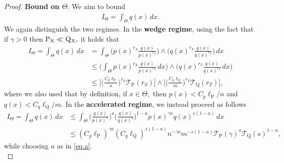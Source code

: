 \documentclass[10pt]{article}
\newcommand{\mT}{\mathcal{T}}
\renewcommand{\P}{\operatorname{P}}
\newcommand{\Q}{\operatorname{Q}}
\newcommand{\sX}{\mathrm{X}}
\begin{document}
\begin{proof}
    \noindent\textbf{Bound on $\Theta.$} We aim to bound
    \begin{align*}
        I_{\Theta} = \int_{\Theta}q(x)\, dx.
    \end{align*}
    We again distinguish the two regimes. In the \textbf{wedge regime}, using the fact that if $\gamma > 0$ then $\P_{\sX} \ll \Q\mathstrut_{\!\sX},$ it holds that 
    \begin{align*}
        I_{\Theta} = \int_{\Theta}q(x)\, dx &= \int_{\Theta}\Big(p(x)^{r_S}\frac{q(x)}{p(x)^{r_S}}\Big)\wedge \Big(q(x)^{r_T}\frac{q(x)}{q(x)^{r_T}}\Big)\, dx\\
        &\leq \bigg(\int_{\Theta}p(x)^{r_S}\frac{q(x)}{p(x)^{r_S}}\, dx\bigg)\wedge\bigg(q(x)^{r_T}\frac{q(x)}{q(x)^{r_T}}\, dx\bigg)\\
        &\leq \Big[\Big(\frac{C_p\ell_{\P}}{n}\Big)^{r_S}\mT_{\P}(r_S)\Big]\wedge \Big[\Big(\frac{C_q\ell_{\Q}}{m}\Big)^{r_T}\mT_{\Q}(r_T)\Big],
    \end{align*}
    where we also used that by definition, if $x \in \Theta,$ then $p(x) < C_p\ell_{\P}/n$ and $q(x) < C_q\ell_{\Q}/m.$ In the \textbf{accelerated regime}, we instead proceed as follows
    \begin{align*}
        I_{\Theta} = \int_{\Theta}q(x)\, dx &\leq \int_{\Theta} \Big(\frac{q(x)}{p(x)^{\gamma}}\Big)^a\Big(\frac{q(x)}{q(x)^s}\Big)^{1 - a}p(x)^{\gamma a}q(x)^{s(1 - a)}\, dx\\
        &\leq (C_p\ell_{\P})^{\gamma a}(C_q\ell_{\Q})^{s(1 - a)}n^{-\gamma a}m^{-s(1 - a)}\mT_{\P}(\gamma)^{a}\mT_{\Q}(s)^{1-a},
    \end{align*}
    while choosing $a$ as in \eqref{eq.a}.\\
    

\end{proof}
\end{document}

